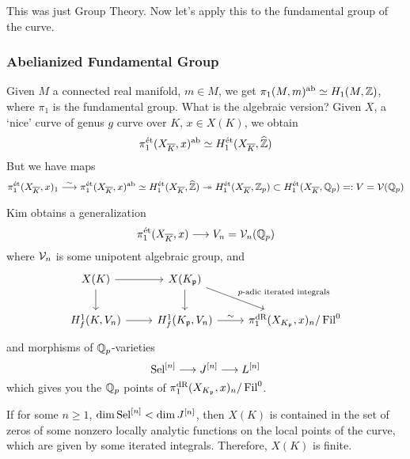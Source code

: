This was just Group Theory. Now let's apply this to the fundamental group of the curve.



\subsubsection{Abelianized Fundamental Group}

Given $M$ a connected real manifold, $m \in M$, we get $\pi_1(M,m)^{\text{ab}} \simeq H_1(M,\mathbb{Z})$, where $\pi_1$ is the fundamental group. What is the algebraic version? Given $X$, a `nice' curve of genus $g$ curve over $K$, $x \in X(K)$, we obtain
	\[
	\pi_1^{\text{\'et}}(X_{\overline{K}}, x)^{\text{ab}} \simeq H_1^{\text{\'et}}(X_{\overline{K}}, \widehat{\mathbb{Z}})
	\]
But we have maps
	\[
	\pi_1^{\text{\'et}}(X_{\overline{K}},x)_1 \stackrel{\sim}{\longrightarrow} \pi_1^{\text{\'et}}(X_{\overline{K}}, x)^{\text{ab}} \simeq H_1^{\text{\'et}}(X_{\overline{K}}, \widehat{\mathbb{Z}}) \twoheadrightarrow H_1^{\text{\'et}}(X_{\overline{K}}, \mathbb{Z}_p) \subset H_1^{\text{\'et}}(X_{\overline{K}}, \mathbb{Q}_p)=: V= \mathcal{V}(\mathbb{Q}_p)
	\]


Kim obtains a generalization
	\[
	\pi_1^{\text{\'et}}(X_{\overline{K}},x) \stackrel{}{\longrightarrow} V_n= \mathcal{V}_n(\mathbb{Q}_p)
	\]
where $\mathcal{V}_n$ is some unipotent algebraic group, and
	\[
	\begin{tikzcd}
	X(K) \arrow{d} \arrow{r} & X(K_\p) \arrow{d} \arrow{dr}{p\text{-adic iterated integrals}} \\
	H_f^1(K,V_n) \arrow{r} & H_f^1(K_\p,V_n) \arrow{r}{\sim} & \pi_1^\dr(X_{K_\p},x)_n/\Fil^0
	\end{tikzcd}
	\]
and morphisms of $\mathbb{Q}_p$-varieties
	\[
	\operatorname{Sel}^{[n]} \stackrel{}{\longrightarrow} J^{[n]} \stackrel{}{\longrightarrow} L^{[n]}
	\]
which gives you the $\mathbb{Q}_p$ points of $\pi_1^{\text{dR}}(X_{K_{\mathfrak{p}}},x)_n/\operatorname{Fil}^0$. 


\begin{thm}[Kim]
If for some $n \geq 1$, $\dim \operatorname{Sel}^{[n]} < \dim J^{[n]}$, then $X(K)$ is contained in the set of zeros of some nonzero locally analytic functions on the local points of the curve, which are given by some iterated integrals. Therefore, $X(K)$ is finite.
\end{thm}















